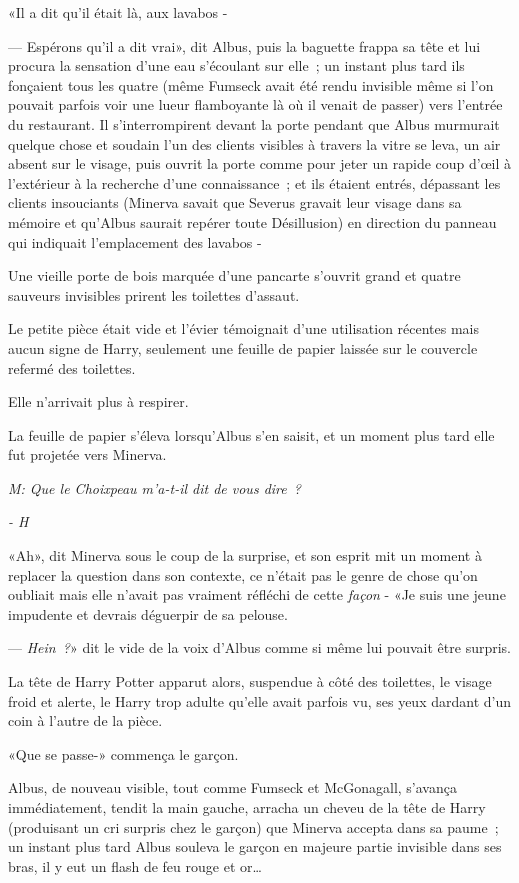 «Il a dit qu'il était là, aux lavabos -

--- Espérons qu'il a dit vrai», dit Albus, puis la baguette frappa sa tête et lui procura la sensation d'une eau s'écoulant sur elle~; un instant plus tard ils fonçaient tous les quatre (même Fumseck avait été rendu invisible même si l'on pouvait parfois voir une lueur flamboyante là où il venait de passer) vers l'entrée du restaurant. Il s'interrompirent devant la porte pendant que Albus murmurait quelque chose et soudain l'un des clients visibles à travers la vitre se leva, un air absent sur le visage, puis ouvrit la porte comme pour jeter un rapide coup d'œil à l'extérieur à la recherche d'une connaissance~; et ils étaient entrés, dépassant les clients insouciants (Minerva savait que Severus gravait leur visage dans sa mémoire et qu'Albus saurait repérer toute Désillusion) en direction du panneau qui indiquait l'emplacement des lavabos -

Une vieille porte de bois marquée d'une pancarte s'ouvrit grand et quatre sauveurs invisibles prirent les toilettes d'assaut.

Le petite pièce était vide et l'évier témoignait d'une utilisation récentes mais aucun signe de Harry, seulement une feuille de papier laissée sur le couvercle refermé des toilettes.

Elle n'arrivait plus à respirer.

La feuille de papier s'éleva lorsqu'Albus s'en saisit, et un moment plus tard elle fut projetée vers Minerva.

\emph{M: Que le Choixpeau m'a-t-il dit de vous dire~?}

\emph{- H}

«Ah», dit Minerva sous le coup de la surprise, et son esprit mit un moment à replacer la question dans son contexte, ce n'était pas le genre de chose qu'on oubliait mais elle n'avait pas vraiment réfléchi de cette \emph{façon} - «Je suis une jeune impudente et devrais déguerpir de sa pelouse.

--- \emph{Hein~?}» dit le vide de la voix d'Albus comme si même lui pouvait être surpris.

La tête de Harry Potter apparut alors, suspendue à côté des toilettes, le visage froid et alerte, le Harry trop adulte qu'elle avait parfois vu, ses yeux dardant d'un coin à l'autre de la pièce.

«Que se passe-» commença le garçon.

Albus, de nouveau visible, tout comme Fumseck et McGonagall, s'avança immédiatement, tendit la main gauche, arracha un cheveu de la tête de Harry (produisant un cri surpris chez le garçon) que Minerva accepta dans sa paume~; un instant plus tard Albus souleva le garçon en majeure partie invisible dans ses bras, il y eut un flash de feu rouge et or…

